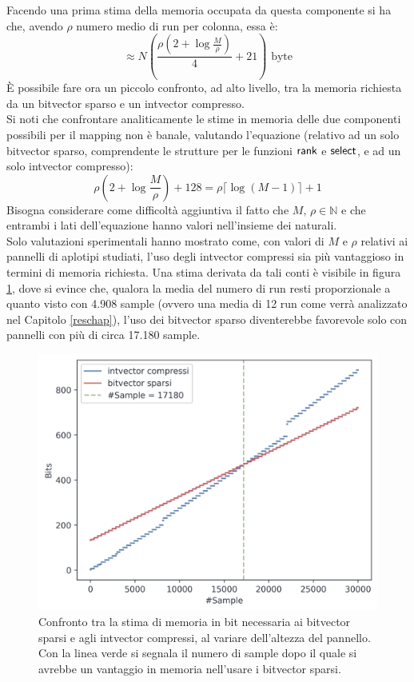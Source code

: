Facendo una prima stima della memoria occupata da questa componente si ha che,
avendo $\rho$ numero medio di run per colonna, essa è:
\begin{equation}
  \label{eq:mapintmem}
  \approx N\left(\frac{\rho\left(2+\log\frac{M}{\rho}\right)}{4}+21\right)\mbox{ byte} 
\end{equation}
È possibile fare ora un piccolo confronto, ad alto livello, tra la memoria
richiesta da un bitvector sparso e un intvector compresso.\\
Si noti che confrontare analiticamente le stime in memoria delle due componenti
possibili per il mapping non è banale, valutando l'equazione
(relativo ad un solo bitvector sparso, comprendente le strutture per
le funzioni $\mbox{\rm {\sf rank}}$ e $\mbox{\rm {\sf select}}$, e ad un solo intvector
compresso): 
\begin{equation}
  \label{eq:mapbvintmem}
  \rho\left(2+\log\frac{M}{\rho}\right)+128=\rho\lceil\log(M-1)\rceil+1
\end{equation}
Bisogna considerare come difficoltà aggiuntiva il fatto che $M,\,\rho\in
\mathbb{N}$ e che entrambi i lati dell'equazione hanno valori nell'insieme dei
naturali.\\

Solo valutazioni sperimentali hanno mostrato come, con valori di $M$ e $\rho$
relativi ai pannelli di aplotipi studiati, l'uso degli intvector compressi sia
più vantaggioso in termini di memoria richiesta. Una stima derivata da tali
conti è visibile in figura \ref{fig:bvvsint}, dove si evince che, qualora la
media del numero di run resti proporzionale a quanto visto con 4.908 sample
(ovvero una media di 12 run come verrà
analizzato nel Capitolo \ref{reschap}), l'uso dei
bitvector sparso diventerebbe favorevole solo con pannelli con più di circa
17.180 sample. 
\begin{figure}
  \centering
  \includegraphics[scale = 0.7]{img/bv_vs_iv.png}
  \caption{Confronto tra la stima di memoria in bit necessaria ai bitvector
    sparsi e agli 
    intvector compressi, al variare dell'altezza del pannello. Con la linea
    verde si segnala il numero di sample dopo il quale si avrebbe un vantaggio
    in memoria nell'usare i bitvector sparsi.}
  \label{fig:bvvsint}
\end{figure}
